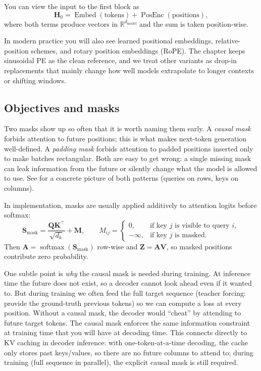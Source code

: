 You can view the input to the first block as
\[
\mathbf{H}_0 = \operatorname{Embed}(\text{tokens}) + \operatorname{PosEnc}(\text{positions}),
\]
where both terms produce vectors in \(\mathbb{R}^{d_{\text{model}}}\) and the sum is taken position-wise.

In modern practice you will also see learned positional embeddings, relative-position schemes, and rotary position embeddings (RoPE). The chapter keeps sinusoidal PE as the clean reference, and we treat other variants as drop-in replacements that mainly change how well models extrapolate to longer contexts or shifting windows.

\subsection{Objectives and masks}
\label{sec:transformers_masks_and_training_objectives}
Two masks show up so often that it is worth naming them early.
A \emph{causal mask} forbids attention to future positions; this is what makes next-token generation well-defined.
A \emph{padding mask} forbids attention to padded positions inserted only to make batches rectangular.
Both are easy to get wrong: a single missing mask can leak information from the future or silently change what the model is allowed to use.
See  for a concrete picture of both patterns (queries on rows, keys on columns).

In implementation, masks are usually applied additively to attention logits before softmax:
\begin{equation}
\mathbf{S}_{\text{mask}}
= \frac{\mathbf{Q}\mathbf{K}^\top}{\sqrt{d_k}} + \mathbf{M},
\qquad
M_{ij} =
\begin{cases}
0, & \text{if key } j \text{ is visible to query } i,\\
-\infty, & \text{if key } j \text{ is masked.}
\end{cases}
\label{eq:transformers_additive_mask_logits}
\end{equation}
Then \(\mathbf{A}=\operatorname{softmax}(\mathbf{S}_{\text{mask}})\) row-wise and \(\mathbf{Z}=\mathbf{A}\mathbf{V}\), so masked positions contribute zero probability.

One subtle point is \emph{why} the causal mask is needed during training. At inference time the future does not exist, so a
decoder cannot look ahead even if it wanted to. But during training we often feed the full target sequence (teacher forcing:
provide the ground-truth previous tokens)
so we can compute a loss at every position. Without a causal mask, the decoder would ``cheat'' by attending to future target
tokens. The causal mask enforces the same information constraint at training time that you will have at decoding time.
This connects directly to KV caching in decoder inference: with one-token-at-a-time decoding, the cache only stores past keys/values, so there are no future columns to attend to; during training (full sequence in parallel), the explicit causal mask is still required.

